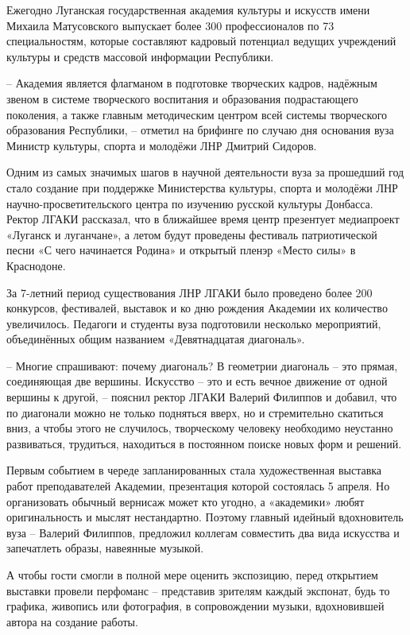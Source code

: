 Ежегодно Луганская государственная академия культуры и искусств имени Михаила
Матусовского выпускает более 300 профессионалов по 73 специальностям, которые
составляют кадровый потенциал ведущих учреждений культуры и средств массовой
информации Республики.

– Академия является флагманом в подготовке творческих кадров, надёжным звеном в
системе творческого воспитания и образования подрастающего поколения, а также
главным методическим центром всей системы творческого образования Республики, –
отметил на брифинге по случаю дня основания вуза Министр культуры, спорта и
молодёжи ЛНР Дмитрий Сидоров.

Одним из самых значимых шагов в научной деятельности вуза за прошедший год
стало создание при поддержке Министерства культуры, спорта и молодёжи ЛНР
научно-просветительского центра по изучению русской культуры Донбасса. Ректор
ЛГАКИ рассказал, что в ближайшее время центр презентует медиапроект «Луганск и
луганчане», а летом будут проведены фестиваль патриотической песни «С чего
начинается Родина» и открытый пленэр «Место силы» в Краснодоне.

За 7-летний период существования ЛНР ЛГАКИ было проведено более 200 конкурсов,
фестивалей, выставок и ко дню рождения Академии их количество увеличилось.
Педагоги и студенты вуза подготовили несколько мероприятий, объединённых общим
названием «Девятнадцатая диагональ».

– Многие спрашивают: почему диагональ? В геометрии диагональ – это прямая,
соединяющая две вершины. Искусство – это и есть вечное движение от одной
вершины к другой, – пояснил ректор ЛГАКИ Валерий Филиппов и добавил, что по
диагонали можно не только подняться вверх, но и стремительно скатиться вниз, а
чтобы этого не случилось, творческому человеку необходимо неустанно
развиваться, трудиться, находиться в постоянном поиске новых форм и решений.

Первым событием в череде запланированных стала художественная выставка работ
преподавателей Академии, презентация которой состоялась 5 апреля. Но
организовать обычный вернисаж может кто угодно, а «академики» любят
оригинальность и мыслят нестандартно. Поэтому главный идейный вдохновитель вуза
– Валерий Филиппов, предложил коллегам совместить два вида искусства и
запечатлеть образы, навеянные музыкой.

А чтобы гости смогли в полной мере оценить экспозицию, перед открытием выставки
провели перфоманс – представив зрителям каждый экспонат, будь то графика,
живопись или фотография, в сопровождении музыки, вдохновившей автора на
создание работы.

